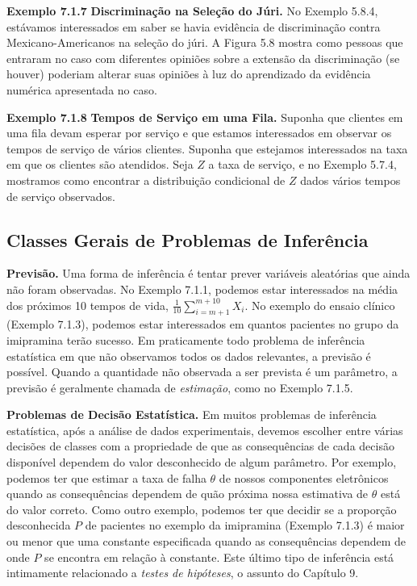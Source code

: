 \vspace{1cm}
\noindent\textbf{Exemplo 7.1.7} \quad \textbf{Discriminação na Seleção do Júri.} No Exemplo 5.8.4, estávamos interessados em saber se havia evidência de discriminação contra Mexicano-Americanos na seleção do júri. A Figura 5.8 mostra como pessoas que entraram no caso com diferentes opiniões sobre a extensão da discriminação (se houver) poderiam alterar suas opiniões à luz do aprendizado da evidência numérica apresentada no caso.

\vspace{1cm}
\noindent\textbf{Exemplo 7.1.8} \quad \textbf{Tempos de Serviço em uma Fila.} Suponha que clientes em uma fila devam esperar por serviço e que estamos interessados em observar os tempos de serviço de vários clientes. Suponha que estejamos interessados na taxa em que os clientes são atendidos. Seja $Z$ a taxa de serviço, e no Exemplo 5.7.4, mostramos como encontrar a distribuição condicional de $Z$ dados vários tempos de serviço observados.

\subsection*{Classes Gerais de Problemas de Inferência}

\textbf{Previsão.} Uma forma de inferência é tentar prever variáveis aleatórias que ainda não foram observadas. No Exemplo 7.1.1, podemos estar interessados na média dos próximos 10 tempos de vida, $\frac{1}{10}\sum_{i=m+1}^{m+10} X_i$. No exemplo do ensaio clínico (Exemplo 7.1.3), podemos estar interessados em quantos pacientes no grupo da imipramina terão sucesso. Em praticamente todo problema de inferência estatística em que não observamos todos os dados relevantes, a previsão é possível. Quando a quantidade não observada a ser prevista é um parâmetro, a previsão é geralmente chamada de \textit{estimação}, como no Exemplo 7.1.5.

\vspace{0.5cm}
\noindent\textbf{Problemas de Decisão Estatística.} Em muitos problemas de inferência estatística, após a análise de dados experimentais, devemos escolher entre várias decisões de classes com a propriedade de que as consequências de cada decisão disponível dependem do valor desconhecido de algum parâmetro. Por exemplo, podemos ter que estimar a taxa de falha $\theta$ de nossos componentes eletrônicos quando as consequências dependem de quão próxima nossa estimativa de $\theta$ está do valor correto. Como outro exemplo, podemos ter que decidir se a proporção desconhecida $P$ de pacientes no exemplo da imipramina (Exemplo 7.1.3) é maior ou menor que uma constante especificada quando as consequências dependem de onde $P$ se encontra em relação à constante. Este último tipo de inferência está intimamente relacionado a \textit{testes de hipóteses}, o assunto do Capítulo 9.

